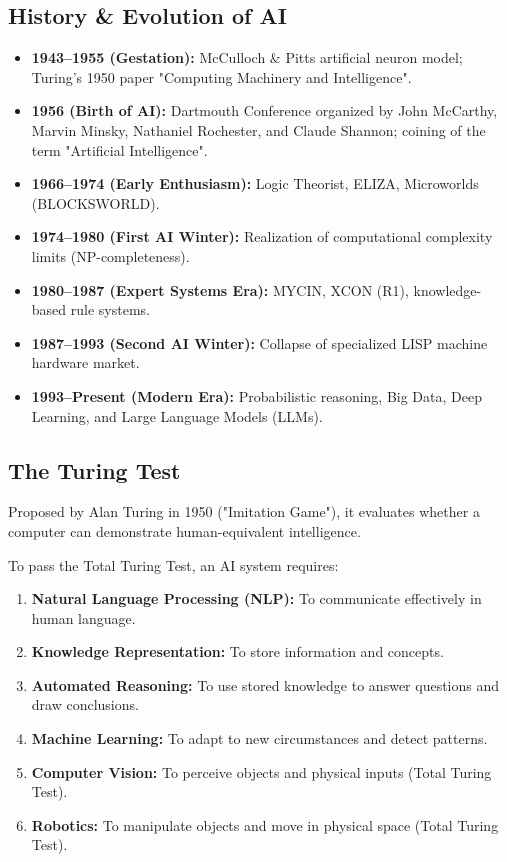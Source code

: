 \documentclass[12pt,a4paper]{article}
\begin{document}
\subsection{History \& Evolution of AI}
\begin{itemize}[leftmargin=*, itemsep=3pt]
  \item \textbf{1943--1955 (Gestation):} McCulloch \& Pitts artificial neuron model; Turing's 1950 paper "Computing Machinery and Intelligence".
  \item \textbf{1956 (Birth of AI):} Dartmouth Conference organized by John McCarthy, Marvin Minsky, Nathaniel Rochester, and Claude Shannon; coining of the term "Artificial Intelligence".
  \item \textbf{1966--1974 (Early Enthusiasm):} Logic Theorist, ELIZA, Microworlds (BLOCKSWORLD).
  \item \textbf{1974--1980 (First AI Winter):} Realization of computational complexity limits (NP-completeness).
  \item \textbf{1980--1987 (Expert Systems Era):} MYCIN, XCON (R1), knowledge-based rule systems.
  \item \textbf{1987--1993 (Second AI Winter):} Collapse of specialized LISP machine hardware market.
  \item \textbf{1993--Present (Modern Era):} Probabilistic reasoning, Big Data, Deep Learning, and Large Language Models (LLMs).
\end{itemize}

\subsection{The Turing Test}
Proposed by Alan Turing in 1950 ("Imitation Game"), it evaluates whether a computer can demonstrate human-equivalent intelligence.

\begin{tcolorbox}[examplebox, title={Capabilities Required for the Turing Test}]
  To pass the Total Turing Test, an AI system requires:
  \begin{enumerate}[leftmargin=*, noitemsep]
    \item \textbf{Natural Language Processing (NLP):} To communicate effectively in human language.
    \item \textbf{Knowledge Representation:} To store information and concepts.
    \item \textbf{Automated Reasoning:} To use stored knowledge to answer questions and draw conclusions.
    \item \textbf{Machine Learning:} To adapt to new circumstances and detect patterns.
    \item \textbf{Computer Vision:} To perceive objects and physical inputs (Total Turing Test).
    \item \textbf{Robotics:} To manipulate objects and move in physical space (Total Turing Test).
  \end{enumerate}
\end{tcolorbox}
\end{document}
